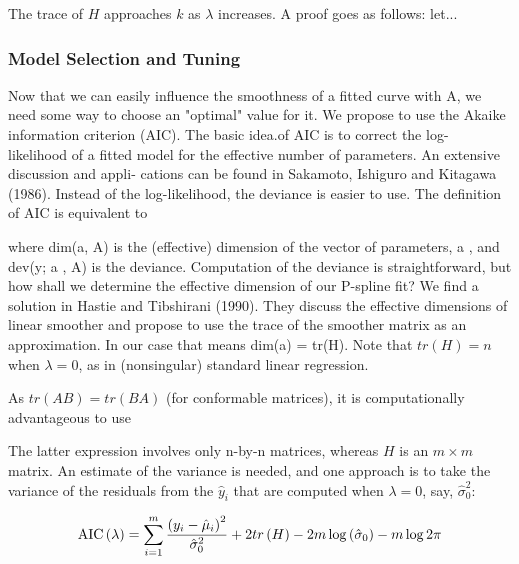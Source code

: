 \documentclass[12pt]{article}
\newcommand*\needsparaphrased{\color{red}}
\newcommand*\outlineskeleton{\color{green}}
\begin{document}
{\needsparaphrased The trace of $H$ approaches $k$ as $\lambda$ increases. A proof goes as follows: let...}

\subsubsection{{\outlineskeleton Model Selection and Tuning}}
{\needsparaphrased  Now that we can easily influence the smoothness of a fitted curve with A, we need some way to choose an "optimal" value for it. We propose to use the Akaike information criterion (AIC). The basic idea.of AIC is to correct the log- likelihood of a fitted model for the effective number of parameters. An extensive discussion and appli- cations can be found in Sakamoto, Ishiguro and Kitagawa (1986). Instead of the log-likelihood, the deviance is easier to use. The definition of AIC is equivalent to}

{\needsparaphrased where dim(a, A) is the (effective) dimension of the vector of parameters, a , and dev(y; a , A) is the deviance.
Computation of the deviance is straightforward, but how shall we determine the effective dimension of our P-spline fit? We find a solution in Hastie and Tibshirani (1990). They discuss the effective dimensions of linear smoother and propose to use the trace of the smoother matrix as an approximation. In our case that means dim(a) = tr(H). Note that $tr\left(H\right) = n$ when $\lambda = 0$, as in (nonsingular) standard linear regression. 

As $tr\left(AB\right) = tr\left(BA\right)$ (for conformable matrices), it is computationally advantageous to use}

{\needsparaphrased The latter expression involves only n-by-n matrices, whereas $H$ is an $m \times m$ matrix. An estimate of the variance is needed, and one approach is to take the variance of the residuals from the $\hat{y}_i$ that are computed when $\lambda = 0$, say, $\hat{\sigma}_0^2$:}

\begin{equation} \label{eq:univariate_AIC}
\textup{AIC}\left(\lambda\right) = \sum_{i=1}^m \frac{\left( y_i - \hat{\mu}_i \right)^2}{\hat{\sigma}_0^2} + 2tr\left(H\right) - 2m\log\left(\hat{\sigma}_0\right) - m\log 2\pi
\end{equation}
\end{document}
